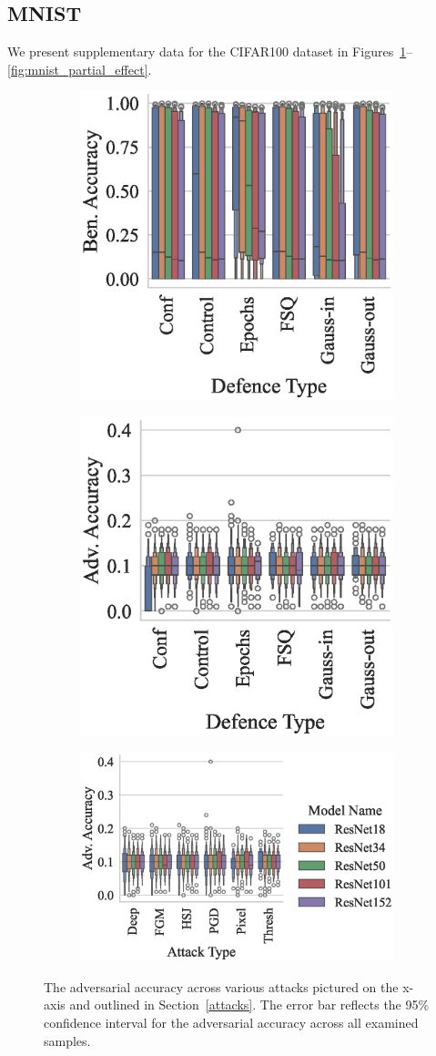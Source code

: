 \clearpage
\subsection{MNIST}
We present supplementary data for the CIFAR100 dataset in Figures~\ref{fig:mnist_accuracies}--\ref{fig:mnist_partial_effect}.

\begin{figure}[!h]
\begin{subfigure}
    \centering
    \includegraphics[trim={0 5pt 0 10pt},clip,width=.27\textwidth]{mnist/ben_accuracy_vs_defence_type.eps}
\end{subfigure}
\begin{subfigure}
    \centering
    \includegraphics[trim={0 5pt 0 10pt},clip,width=.27\textwidth]{mnist/adv_accuracy_vs_defence_type.eps}
\end{subfigure}
\begin{subfigure}
    \centering
    \includegraphics[trim={0 5pt 0 10pt},clip,width=.4\textwidth]{mnist/adv_accuracy_vs_attack_type.eps}
\end{subfigure}
\caption{The adversarial accuracy across various attacks pictured on the x-axis and outlined in Section~\ref{attacks}. The error bar reflects the 95\% confidence interval for the adversarial accuracy across all examined samples.}
\label{fig:mnist_accuracies}
\end{figure}

